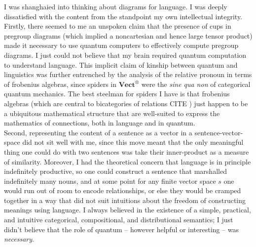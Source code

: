 I was shanghaied into thinking about diagrams for language. I was deeply dissatisfied with the content from the standpoint my own intellectual integrity. Firstly, there seemed to me an unspoken claim that the presence of cups in pregroup diagrams (which implied a noncartesian and hence large tensor product) made it necessary to use quantum computers to effectively compute pregroup diagrams. I just could not believe that my brain required quantum computation to understand language. This implicit claim of kinship between quantum and linguistics was further entrenched by the analysis of the relative pronoun in terms of frobenius algebras, since spiders in $\mathbf{Vect}^\otimes$ were the \emph{sine qua non} of categorical quantum mechanics. The best steelman for spiders I have is that frobenius algebras (which are central to bicategories of relations \bR CITE \e) just happen to be a ubiquitous mathematical structure that are well-suited to express the mathematics of connections, both in language and in quantum.\\

Second, representing the content of a sentence as a vector in a sentence-vector-space did not sit well with me, since this move meant that the only meaningful thing one could do with two sentences was take their inner-product as a measure of similarity. Moreover, I had the theoretical concern that language is in principle indefinitely productive, so one could construct a sentence that marshalled indefinitely many nouns, and at some point for any finite vector space $s$ one would run out of room to encode relationships, or else they would be cramped together in a way that did not suit intuitions about the freedom of constructing meanings using language. I always believed in the existence of a simple, practical, and intuitive categorical, compositional, and distributional semantics; I just didn't believe that the role of quantum -- however helpful or interesting -- was \emph{necessary}.

